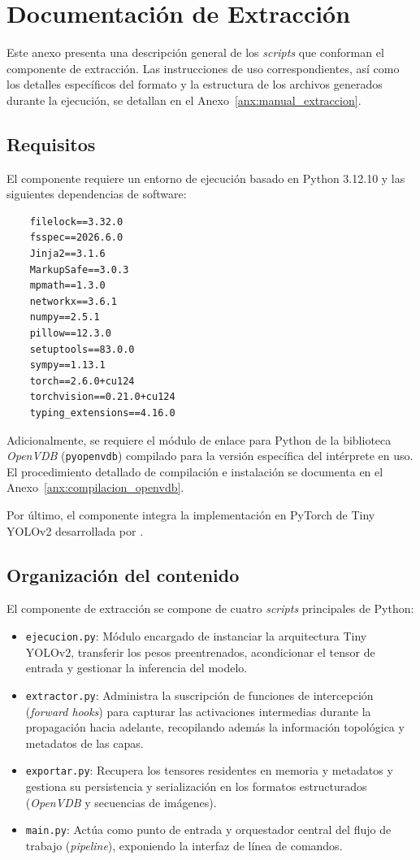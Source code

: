 \chapter{Documentación de Extracción}
\label{anx:doc_extraccion}
Este anexo presenta una descripción general de los \textit{scripts} que conforman el componente de extracción. 
Las instrucciones de uso correspondientes, así como los detalles específicos del formato y la estructura de los 
archivos generados durante la ejecución, se detallan en el Anexo~\ref{anx:manual_extraccion}.

\section{Requisitos}
El componente requiere un entorno de ejecución basado en Python 3.12.10 y las siguientes dependencias de software:

\begin{verbatim}
    filelock==3.32.0
    fsspec==2026.6.0
    Jinja2==3.1.6
    MarkupSafe==3.0.3
    mpmath==1.3.0
    networkx==3.6.1
    numpy==2.5.1
    pillow==12.3.0
    setuptools==83.0.0
    sympy==1.13.1
    torch==2.6.0+cu124
    torchvision==0.21.0+cu124
    typing_extensions==4.16.0
\end{verbatim}
Adicionalmente, se requiere el módulo de enlace para Python de la biblioteca \textit{OpenVDB} (\texttt{pyopenvdb}) 
compilado para la versión específica del intérprete en uso. El procedimiento detallado de compilación e instalación 
se documenta en el Anexo~\ref{anx:compilacion_openvdb}.
\medskip

Por último, el componente integra la implementación en PyTorch de Tiny YOLOv2 desarrollada por \textcite{yolov2_implementation}.

\section{Organización del contenido}
El componente de extracción se compone de cuatro \textit{scripts} principales de Python:
\begin{itemize}
    \item \texttt{ejecucion.py}: Módulo encargado de instanciar la arquitectura Tiny YOLOv2, transferir los pesos preentrenados, acondicionar el tensor de entrada y 
    gestionar la inferencia del modelo.
    \item \texttt{extractor.py}: Administra la suscripción de funciones de intercepción (\textit{forward hooks}) para capturar las activaciones intermedias durante 
    la propagación hacia adelante, recopilando además la información topológica y metadatos de las capas.
    \item \texttt{exportar.py}: Recupera los tensores residentes en memoria y metadatos y gestiona su persistencia y serialización en los formatos estructurados (\textit{OpenVDB} 
    y secuencias de imágenes).
    \item \texttt{main.py}: Actúa como punto de entrada y orquestador central del flujo de trabajo (\textit{pipeline}), exponiendo la interfaz de línea de comandos.
\end{itemize}

